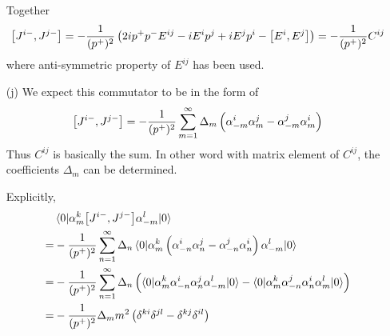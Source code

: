 \begin{enumerate}[label=(\alph*)]
		Together
		\begin{equation}
			\comm{J^{i-}}{J^{j-}} = - \frac{1}{(p^+)^2} \left( 2i p^+ p^- E^{ij} - i E^i p^j + i E^j p^i - \comm{E^i}{E^j} \right) = - \frac{1}{(p^+)^2} C^{ij}
		\end{equation}
		where anti-symmetric property of $E^{ij}$ has been used.
	\item [(j)]
		We expect this commutator to be in the form of
		\begin{equation}
			\comm{J^{i-}}{J^{j-}} = - \frac{1}{(p^+)^2} \sum_{m=1}^{\infty} \Delta_m \left( \alpha^i_{-m} \alpha_m^j - \alpha^j_{-m} \alpha^i_m \right)
		\end{equation}
		Thus $C^{ij}$ is basically the sum. In other word with matrix element of $C^{ij}$, the coefficients $\Delta_m$ can be determined. 
		
		Explicitly,
		\begin{align}
			&\braket{0| \alpha^k_m \comm{J^{i-}}{J^{j-}}\alpha^l_{-m} | 0} \notag \\ 
			=& - \frac{1}{(p^+)^2} \sum_{n=1}^{\infty} \Delta_n \braket{0| \alpha^k_m \left( \alpha^i_{-n} \alpha^j_n - \alpha^j_{-n} \alpha^i_n \right)\alpha^l_{-m} | 0} \notag \\
			=& - \frac{1}{(p^+)^2} \sum_{n=1}^{\infty} \Delta_n \left( \braket{0| \alpha^k_m  \alpha^i_{-n} \alpha^j_n \alpha^l_{-m} | 0} - \braket{0|\alpha^k_m  \alpha^j_{-n} \alpha^i_n \alpha^l_m |0}\right) \notag \\
			=& - \frac{1}{(p^+)^2}  \Delta_m m^2 \left( \delta^{ki} \delta^{jl} - \delta^{kj} \delta^{il}\right) \label{math:Delta}
		\end{align}


\end{enumerate}
